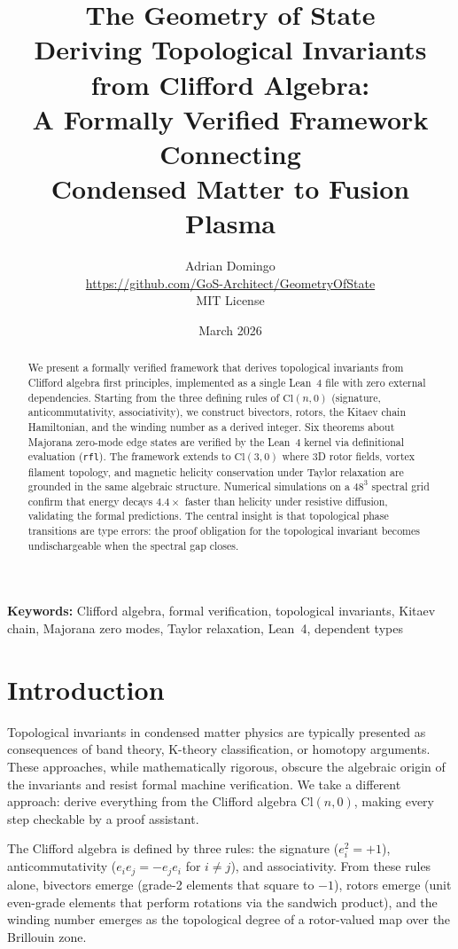 \documentclass[11pt,a4paper]{article}
\title{\textbf{The Geometry of State} \\[6pt]
\large Deriving Topological Invariants from Clifford Algebra: \\
A Formally Verified Framework Connecting \\
Condensed Matter to Fusion Plasma}
\author{Adrian Domingo \\[2pt]
\small \url{https://github.com/GoS-Architect/GeometryOfState} \\
\small MIT License}
\date{March 2026}
\newcommand{\Cl}[1]{\mathrm{Cl}(#1)}
\begin{document}
\maketitle

\begin{abstract}
We present a formally verified framework that derives topological invariants from Clifford algebra first principles, implemented as a single Lean~4 file with zero external dependencies. Starting from the three defining rules of $\Cl{n,0}$ (signature, anticommutativity, associativity), we construct bivectors, rotors, the Kitaev chain Hamiltonian, and the winding number as a derived integer. Six theorems about Majorana zero-mode edge states are verified by the Lean~4 kernel via definitional evaluation (\texttt{rfl}). The framework extends to $\Cl{3,0}$ where 3D rotor fields, vortex filament topology, and magnetic helicity conservation under Taylor relaxation are grounded in the same algebraic structure. Numerical simulations on a $48^3$ spectral grid confirm that energy decays $4.4\times$ faster than helicity under resistive diffusion, validating the formal predictions. The central insight is that topological phase transitions are type errors: the proof obligation for the topological invariant becomes undischargeable when the spectral gap closes.
\end{abstract}

\smallskip
\noindent\textbf{Keywords:} Clifford algebra, formal verification, topological invariants, Kitaev chain, Majorana zero modes, Taylor relaxation, Lean~4, dependent types

\tableofcontents

\section{Introduction}

Topological invariants in condensed matter physics are typically presented as consequences of band theory, K-theory classification, or homotopy arguments. These approaches, while mathematically rigorous, obscure the algebraic origin of the invariants and resist formal machine verification. We take a different approach: derive everything from the Clifford algebra $\Cl{n,0}$, making every step checkable by a proof assistant.

The Clifford algebra is defined by three rules: the signature ($e_i^2 = +1$), anticommutativity ($e_i e_j = -e_j e_i$ for $i \neq j$), and associativity. From these rules alone, bivectors emerge (grade-2 elements that square to $-1$), rotors emerge (unit even-grade elements that perform rotations via the sandwich product), and the winding number emerges as the topological degree of a rotor-valued map over the Brillouin zone.
\end{document}

